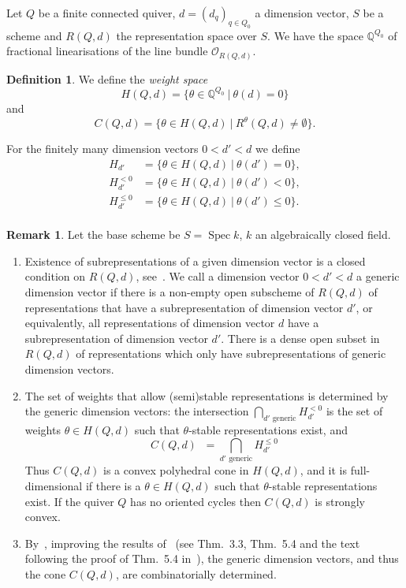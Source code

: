 \documentclass[10pt,a4paper]{amsart}
\theoremstyle{definition}
\newtheorem{defi}[theo]{Definition}
\newtheorem{rema}[theo]{Remark}
\def\Q{\mathds Q}
\def\O{\mathcal O}
\DeclareMathOperator{\Spec}{Spec}
\begin{document}

Let $Q$ be a finite connected quiver, $d=(d_q)_{q\in Q_0}$ a dimension vector, 
$S$ be a scheme and $R(Q,d)$ the representation space over $S$. We have the space 
$\Q^{Q_0}$ of fractional linearisations of the line bundle $\O_{R(Q,d)}$. 

\begin{defi} We define the {\it weight space}
\[\textstyle
H(Q,d)=\big\{\theta\in\Q^{Q_0}\:|\:\theta(d)=0\big\}
\]
and
\[
C(Q,d)=\big\{\theta\in H(Q,d)\:|\:R^\theta(Q,d)\neq\emptyset\big\}.
\]
\end{defi}

For the finitely many dimension vectors $0<d'<d$ we define
\[
\begin{aligned}
H_{d'}&=\{\theta\in H(Q,d)\:|\:\theta(d')=0\},\\
H^{<0}_{d'}&=\{\theta\in H(Q,d)\:|\:\theta(d')<0\},\\
H^{\leq0}_{d'}&=\{\theta\in H(Q,d)\:|\:\theta(d')\leq0\}.\\
\end{aligned}
\]

\begin{rema}\label{rem:CQd}
Let the base scheme be $S=\Spec k$, $k$ an algebraically closed field.

\begin{enumerate}[label=(\arabic*)]
\item\label{rema1.12_1}
Existence of subrepresentations of a given dimension vector is a closed condition 
on $R(Q,d)$, see~\cite[Lemma~3.1]{Scho92}.
We call a dimension vector $0<d'<d$ a generic dimension vector if there is 
a non-empty open subscheme of $R(Q,d)$ of representations that have a 
subrepresentation of dimension vector $d'$, or equivalently, all representations
of dimension vector $d$ have a subrepresentation of dimension vector $d'$.
There is a dense open subset in $R(Q,d)$ of representations which only have
subrepresentations of generic dimension vectors. %

\item\label{rema1.12_2}
The set of weights that allow (semi)stable representations is determined by 
the generic dimension vectors:
the intersection $\bigcap_{\text{$d'\!\!$ generic}}H^{<0}_{d'}$ is the set of 
weights $\theta\in H(Q,d)$ such that $\theta$-stable representations exist, and
\[
C(Q,d)\;\;=\bigcap_{\text{$d'\!\!$ generic}}\!\!\!H^{\leq0}_{d'}
\] 
Thus $C(Q,d)$ is a convex polyhedral cone in $H(Q,d)$, and it is full-dimensional 
if there is a $\theta\in H(Q,d)$ such that $\theta$-stable representations exist.
If the quiver $Q$ has no oriented cycles then $C(Q,d)$ is strongly convex. %

\item\label{rema1.12_3}
By~\cite[Cor.~1]{Cr96}, improving the results of~\cite{Scho92} (see Thm.\ 3.3, 
Thm.\ 5.4 and the text following the proof of Thm.\ 5.4 in~\cite{Scho92}), the 
generic dimension vectors, and thus the cone $C(Q,d)$, are combinatorially determined. 
\end{enumerate}
\end{rema}
\end{document}
